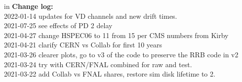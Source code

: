 \documentclass[12pt]{article}
\begin{document}
 in\pagebreak 
 {\bf Change log:}\\
2022-01-14 updates for VD channels and new drift times.\\2021-07-25 see effects of PD 2 delay\\2021-04-27 change HSPEC06 to 11 from 15 per CMS numbers from Kirby\\2021-04-21 clarify CERN vs Collab for first 10 years\\2021-03-26 clearer plots, go to v3 of the code to preserve the RRB code in v2\\2021-03-24 try with CERN/FNAL combined for raw and test.\\2021-03-22 add Collab vs FNAL shares, restore sim disk lifetime to 2.\\
\end{document}
